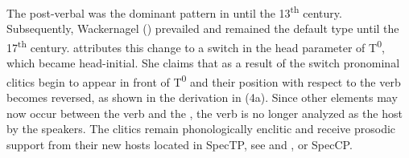 \documentclass[output=paper,modfonts,newtxmath,hidelinks]{langscibook}
\begin{document}
The post-verbal  was the dominant pattern in  until the 13\textsuperscript{th} century. Subsequently, Wackernagel ()  prevailed and remained the default type until the 17\textsuperscript{th} century. \citeauthor{pancheva2005} attributes this change to a switch in the head parameter of T\textsuperscript{0}, which became head-initial. She claims that as a result of the switch pronominal clitics begin to appear in front of T\textsuperscript{0} and their position with respect to the verb becomes reversed, as shown in the derivation in (4a). Since other elements may now occur between the verb and the , the verb is no longer analyzed as the  host by the speakers. The clitics remain phonologically enclitic and receive prosodic support from their new hosts located in SpecTP, see  and , or SpecCP.
\end{document}
